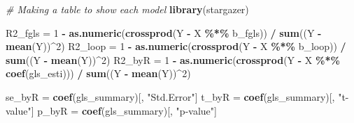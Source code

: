 \documentclass[
  12pt,
]{article}
\newenvironment{Shaded}{\begin{snugshade}}{\end{snugshade}}
\newcommand{\CommentTok}[1]{\textcolor[rgb]{0.56,0.35,0.01}{\textit{#1}}}
\newcommand{\DecValTok}[1]{\textcolor[rgb]{0.00,0.00,0.81}{#1}}
\newcommand{\KeywordTok}[1]{\textcolor[rgb]{0.13,0.29,0.53}{\textbf{#1}}}
\newcommand{\NormalTok}[1]{#1}
\newcommand{\OperatorTok}[1]{\textcolor[rgb]{0.81,0.36,0.00}{\textbf{#1}}}
\newcommand{\StringTok}[1]{\textcolor[rgb]{0.31,0.60,0.02}{#1}}
\begin{document}
\begin{Shaded}
\begin{Highlighting}[]
\CommentTok{\# Making a table to show each model}
\KeywordTok{library}\NormalTok{(stargazer)}

\NormalTok{R2\_fgls =}\StringTok{ }\DecValTok{1} \OperatorTok{{-}}\StringTok{ }\KeywordTok{as.numeric}\NormalTok{(}\KeywordTok{crossprod}\NormalTok{(Y }\OperatorTok{{-}}\StringTok{ }\NormalTok{X }\OperatorTok{\%*\%}\StringTok{ }\NormalTok{b\_fgls)) }\OperatorTok{/}\StringTok{ }\KeywordTok{sum}\NormalTok{((Y }\OperatorTok{{-}}\StringTok{ }\KeywordTok{mean}\NormalTok{(Y))}\OperatorTok{\^{}}\DecValTok{2}\NormalTok{)}
\NormalTok{R2\_loop =}\StringTok{ }\DecValTok{1} \OperatorTok{{-}}\StringTok{ }\KeywordTok{as.numeric}\NormalTok{(}\KeywordTok{crossprod}\NormalTok{(Y }\OperatorTok{{-}}\StringTok{ }\NormalTok{X }\OperatorTok{\%*\%}\StringTok{ }\NormalTok{b\_loop)) }\OperatorTok{/}\StringTok{ }\KeywordTok{sum}\NormalTok{((Y }\OperatorTok{{-}}\StringTok{ }\KeywordTok{mean}\NormalTok{(Y))}\OperatorTok{\^{}}\DecValTok{2}\NormalTok{)}
\NormalTok{R2\_byR  =}\StringTok{ }\DecValTok{1} \OperatorTok{{-}}\StringTok{ }\KeywordTok{as.numeric}\NormalTok{(}\KeywordTok{crossprod}\NormalTok{(Y }\OperatorTok{{-}}\StringTok{ }\NormalTok{X }\OperatorTok{\%*\%}\StringTok{ }\KeywordTok{coef}\NormalTok{(gls\_esti))) }\OperatorTok{/}\StringTok{ }\KeywordTok{sum}\NormalTok{((Y }\OperatorTok{{-}}\StringTok{ }\KeywordTok{mean}\NormalTok{(Y))}\OperatorTok{\^{}}\DecValTok{2}\NormalTok{)}

\NormalTok{se\_byR  =}\StringTok{ }\KeywordTok{coef}\NormalTok{(gls\_summary)[, }\StringTok{"Std.Error"}\NormalTok{]}
\NormalTok{t\_byR   =}\StringTok{ }\KeywordTok{coef}\NormalTok{(gls\_summary)[, }\StringTok{"t{-}value"}\NormalTok{]}
\NormalTok{p\_byR   =}\StringTok{ }\KeywordTok{coef}\NormalTok{(gls\_summary)[, }\StringTok{"p{-}value"}\NormalTok{]}


\end{Highlighting}
\end{Shaded}
\end{document}
